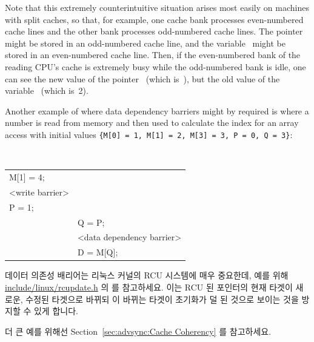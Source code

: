 \begin{enumerate}
Note that this extremely counterintuitive situation arises most easily on
machines with split caches, so that, for example, one cache bank processes
even-numbered cache lines and the other bank processes odd-numbered cache
lines.
The pointer~ might be stored in an odd-numbered cache line, and the
variable~ might be stored in an even-numbered cache line.  Then, if the
even-numbered bank of the reading CPU's cache is extremely busy while the
odd-numbered bank is idle, one can see the new value of the
pointer~ (which is~),
but the old value of the variable~ (which is~2).

Another example of where data dependency barriers might by required is where a
number is read from memory and then used to calculate the index for an array
access with initial values
{\tt \{M[0]~=~1, M[1]~=~2, M[3]~=~3, P~=~0, Q~=~3\}}:
\fi

\vspace{5pt}
\begin{minipage}[t]{\columnwidth}
\tt
\scriptsize
\begin{tabular}{l|p{1.5in}}
	\nf{CPU 1} &	\nf{CPU 2} \\
	\hline
	M[1] = 4; & \\
	<write barrier> & \\
	P = 1;	&	\\
		&	Q = P; \\
		&	<data dependency barrier> \\
		&	D = M[Q]; \\
\end{tabular}
\end{minipage}
\vspace{5pt}

데이터 의존성 배리어는 리눅스 커널의 RCU 시스템에 매우 중요한데, 예를 위해
\url{include/linux/rcupdate.h} 의  를 참고하세요.
이는 RCU 된 포인터의 현재 타겟이 새로운, 수정된 타겟으로 바뀌되 이 바뀌는
타겟이 초기화가 덜 된 것으로 보이는 것을 방지할 수 있게 합니다.

더 큰 예를 위해선 Section~\ref{sec:advsync:Cache Coherency} 를 참고하세요.

\end{enumerate}
